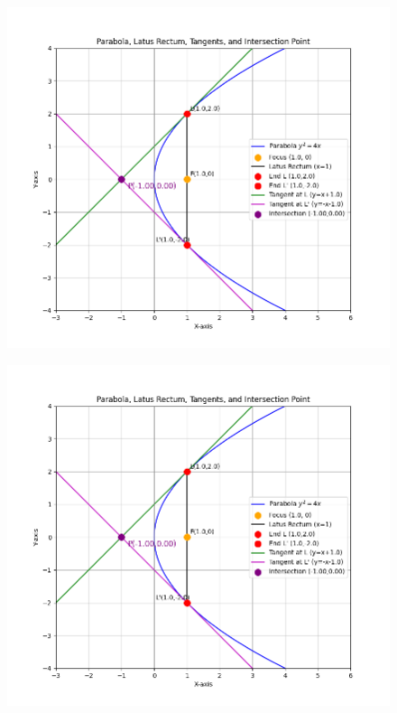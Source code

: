 \documentclass{beamer}
\begin{document}
\begin{frame}
\begin{figure}[H]
\centering
\includegraphics[width=0.8\columnwidth]{../figs/mat181.png}
\caption{}
\label{fig:1}
\end{figure}
\end{frame}

\begin{frame}
\begin{figure}[H]
\centering
\includegraphics[width=0.7\columnwidth]{../figs/mat181.png}
\caption{}
\label{fig:2}
\end{figure}
\end{frame}
\end{document}
